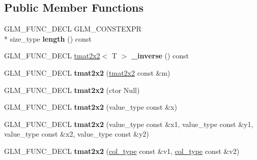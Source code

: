 \subsection*{Public Member Functions}
\begin{DoxyCompactItemize}
\item 
\hypertarget{structglm_1_1detail_1_1tmat2x2_a533f51f175c66b820f2794b018c6ab46}{G\-L\-M\-\_\-\-F\-U\-N\-C\-\_\-\-D\-E\-C\-L G\-L\-M\-\_\-\-C\-O\-N\-S\-T\-E\-X\-P\-R \\*
size\-\_\-type {\bfseries length} () const }\label{structglm_1_1detail_1_1tmat2x2_a533f51f175c66b820f2794b018c6ab46}

\item 
\hypertarget{structglm_1_1detail_1_1tmat2x2_a40d83f7f92111204f47b99d3416edc7f}{G\-L\-M\-\_\-\-F\-U\-N\-C\-\_\-\-D\-E\-C\-L \hyperlink{structglm_1_1detail_1_1tmat2x2}{tmat2x2}$<$ T $>$ {\bfseries \-\_\-inverse} () const }\label{structglm_1_1detail_1_1tmat2x2_a40d83f7f92111204f47b99d3416edc7f}

\item 
\hypertarget{structglm_1_1detail_1_1tmat2x2_a3af20d808ee9aa41d24998c5cc067bc0}{G\-L\-M\-\_\-\-F\-U\-N\-C\-\_\-\-D\-E\-C\-L {\bfseries tmat2x2} (\hyperlink{structglm_1_1detail_1_1tmat2x2}{tmat2x2} const \&m)}\label{structglm_1_1detail_1_1tmat2x2_a3af20d808ee9aa41d24998c5cc067bc0}

\item 
\hypertarget{structglm_1_1detail_1_1tmat2x2_a8f4070e1c3bfd05568b2dd2fddcaffae}{G\-L\-M\-\_\-\-F\-U\-N\-C\-\_\-\-D\-E\-C\-L {\bfseries tmat2x2} (ctor Null)}\label{structglm_1_1detail_1_1tmat2x2_a8f4070e1c3bfd05568b2dd2fddcaffae}

\item 
\hypertarget{structglm_1_1detail_1_1tmat2x2_a57f8c79a1f8df9214a4357b2b1952ff2}{G\-L\-M\-\_\-\-F\-U\-N\-C\-\_\-\-D\-E\-C\-L {\bfseries tmat2x2} (value\-\_\-type const \&x)}\label{structglm_1_1detail_1_1tmat2x2_a57f8c79a1f8df9214a4357b2b1952ff2}

\item 
\hypertarget{structglm_1_1detail_1_1tmat2x2_a846f370292295c373888c00dc63db0c3}{G\-L\-M\-\_\-\-F\-U\-N\-C\-\_\-\-D\-E\-C\-L {\bfseries tmat2x2} (value\-\_\-type const \&x1, value\-\_\-type const \&y1, value\-\_\-type const \&x2, value\-\_\-type const \&y2)}\label{structglm_1_1detail_1_1tmat2x2_a846f370292295c373888c00dc63db0c3}

\item 
\hypertarget{structglm_1_1detail_1_1tmat2x2_a3b1111723d77e85f6f836e6fec22d0d3}{G\-L\-M\-\_\-\-F\-U\-N\-C\-\_\-\-D\-E\-C\-L {\bfseries tmat2x2} (\hyperlink{structglm_1_1detail_1_1tvec2}{col\-\_\-type} const \&v1, \hyperlink{structglm_1_1detail_1_1tvec2}{col\-\_\-type} const \&v2)}\label{structglm_1_1detail_1_1tmat2x2_a3b1111723d77e85f6f836e6fec22d0d3}


\end{DoxyCompactItemize}
